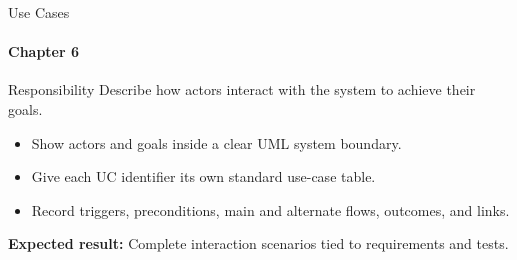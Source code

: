 \begin{frame}{Use Cases}
\framesubtitle{Chapter 6}
\begin{block}{Responsibility}
Describe how actors interact with the system to achieve their goals.
\end{block}
\begin{itemize}
  \item Show actors and goals inside a clear UML system boundary.
  \item Give each UC identifier its own standard use-case table.
  \item Record triggers, preconditions, main and alternate flows, outcomes, and links.
\end{itemize}
\vspace{0.15cm}
\textbf{Expected result:} Complete interaction scenarios tied to requirements and tests.
\end{frame}
